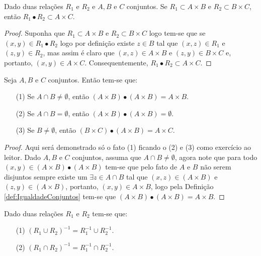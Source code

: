 \begin{theorem}
	Dado duas relações $R_1$ e $R_2$ e $A, B$ e $C$ conjuntos. Se $R_1 \subset A \times B$ e $R_2 \subset B \times C$, então $R_1 \bullet R_2 \subset A \times C$.
\end{theorem}

\begin{proof}
	 Suponha que $R_1 \subset A \times B$ e $R_2 \subset B \times C$ logo tem-se que se $(x, y) \in R_1 \bullet R_2$ logo por definição existe $z \in B$ tal que $(x, z) \in R_1$ e $(z, y) \in R_2$, mas assim é claro que $(x, z) \in A \times B$ e $(z, y) \in B \times C$ e, portanto, $(x, y) \in A \times C$. Consequentemente, $R_1 \bullet R_2 \subset A \times C$.
\end{proof}

\begin{theorem}
	Seja $A, B$ e $C$ conjuntos. Então tem-se que:
	\begin{itemize}
		\item[(1)] Se $A \cap B \neq \emptyset$, então $(A \times B) \bullet (A \times B) = A \times B$.
		\item[(2)] Se $A \cap B = \emptyset$, então $(A \times B) \bullet (A \times B) = \emptyset$.
		\item[(3)] Se $B \neq \emptyset$, então $(B \times C) \bullet (A \times B) = A \times C$.
	\end{itemize}
\end{theorem}

\begin{proof}
	Aqui será demonstrado só o fato (1) ficando o (2) e (3) como exercício ao leitor. Dado $A, B$ e $C$ conjuntos, assuma que $A \cap B \neq \emptyset$, agora note que para todo $(x, y) \in (A \times B) \bullet (A \times B)$ tem-se que pelo fato de $A$ e $B$ não serem disjuntos sempre existe um $\exists z \in A \cap B$ tal que $(x, z) \in (A \times B)$ e $(z, y) \in (A \times B)$, portanto, $(x, y) \in A \times B$, logo pela Definição \ref{def:IgualdadeConjuntos} tem-se que $(A \times B) \bullet (A \times B) = A \times B$.
\end{proof}

\begin{theorem}\label{teo:DistributividadeDaRelacaoInversa}
	Dado duas relações $R_1$ e $R_2$ tem-se que:
	\begin{itemize}
		\item[(1)] $(R_1 \cup R_2)^{-1} = R_1^{-1} \cup R_2^{-1}$.
		\item[(2)] $(R_1 \cap R_2)^{-1} = R_1^{-1} \cap R_2^{-1}$.
	\end{itemize}
\end{theorem}

